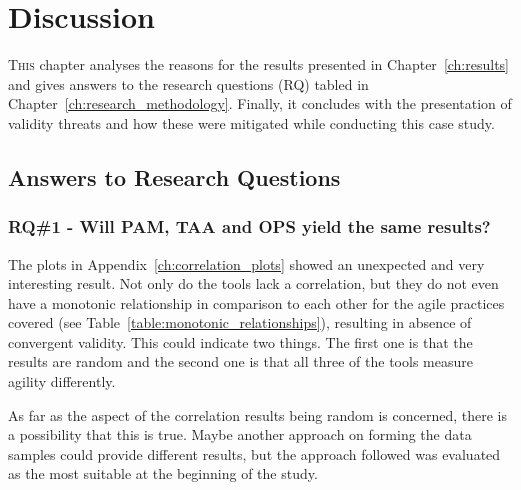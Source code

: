 %


\chapter{Discussion}
\label{ch:discussion}
\lettrine[lines=4, loversize=-0.1, lraise=0.1]{T}{his} chapter analyses the reasons for the results presented in Chapter~\ref{ch:results} and gives answers to the research questions (RQ) tabled in Chapter~\ref{ch:research_methodology}. Finally, it concludes with the presentation of validity threats and how these were mitigated while conducting this case study.

\section{Answers to Research Questions}

\subsection{RQ\#1 - Will \ac{PAM}, \ac{TAA} and \ac{OPS} yield the same results?}

The plots in Appendix~\ref{ch:correlation_plots} showed an unexpected and very interesting result. Not only do the tools lack a correlation, but they do not even have a monotonic relationship in comparison to each other for the agile practices covered (see Table~\ref{table:monotonic_relationships}), resulting in absence of convergent validity. This could indicate two things. The first one is that the results are random and the second one is that all three of the tools measure agility differently. 

As far as the aspect of the correlation results being random is concerned, there is a possibility that this is true. Maybe another approach on forming the data samples could provide different results, but the approach followed was evaluated as the most suitable at the beginning of the study.

